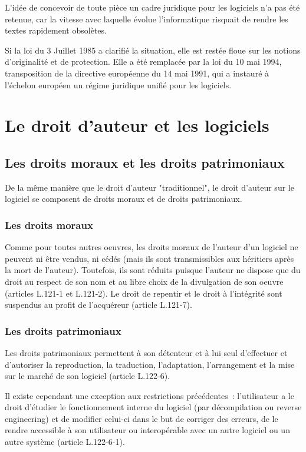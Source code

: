 \documentclass{report}
\begin{document}
L'idée de concevoir de toute pièce un cadre juridique pour les logiciels n'a pas été retenue, car la vitesse avec laquelle évolue l'informatique risquait de rendre les textes rapidement obsolètes.

Si la loi du 3 Juillet 1985 a clarifié la situation, elle est restée floue sur les notions d'originalité et de protection. Elle a été remplacée par la loi du 10 mai 1994, transposition de la directive européenne du 14 mai 1991, qui a instauré à l'échelon européen un régime juridique unifié pour les logiciels.

\chapter{Le droit d'auteur et les logiciels}

\section{Les droits moraux et les droits patrimoniaux}
De la même manière que le droit d'auteur "traditionnel", le droit d'auteur sur le logiciel se composent de droits moraux et de droits patrimoniaux.

\subsection{Les droits moraux}
Comme pour toutes autres oeuvres, les droits moraux de l'auteur d'un logiciel ne peuvent ni être vendus, ni cédés (mais ils sont transmissibles aux héritiers après la mort de l'auteur). Toutefois, ils sont réduits puisque l'auteur ne dispose que du droit au respect de son nom et au libre choix de la divulgation de son oeuvre (articles L.121-1 et L.121-2). Le droit de repentir et le droit à l'intégrité sont suspendus au profit de l'acquéreur (article L.121-7).

\subsection{Les droits patrimoniaux}
Les droits patrimoniaux permettent à son détenteur et à lui seul d'effectuer et d'autoriser la reproduction, la traduction, l'adaptation, l'arrangement et la mise sur le marché de son logiciel (article L.122-6).

Il existe cependant une exception aux restrictions précédentes~: l'utilisateur a le droit d'étudier le fonctionnement interne du logiciel (par décompilation ou reverse engineering) et de modifier celui-ci dans le but de corriger des erreurs, de le rendre accessible à son utilisateur ou interopérable avec un autre logiciel ou un autre système (article L.122-6-1).
\end{document}
